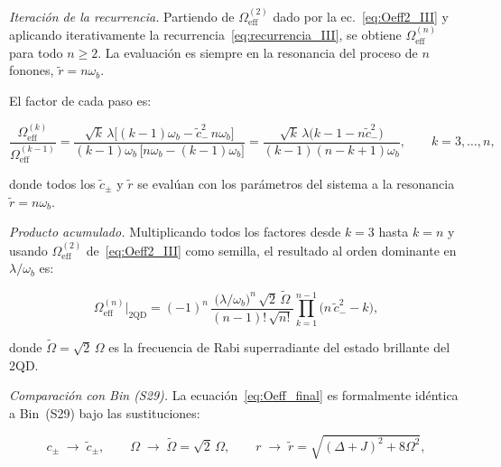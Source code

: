 \documentclass[12pt]{article}
\begin{document}

\textit{Iteración de la recurrencia.}
Partiendo de $\Omega_\mathrm{eff}^{(2)}$ dado por la
ec.~\eqref{eq:Oeff2_III} y aplicando iterativamente la
recurrencia~\eqref{eq:recurrencia_III}, se obtiene
$\Omega_\mathrm{eff}^{(n)}$ para todo $n \geq 2$.
La evaluación es siempre en la resonancia del proceso de
$n$ fonones, $\tilde{r} = n\omega_b$.

\medskip
\noindent
El factor de cada paso es:

\begin{equation}
	\frac{\Omega_\mathrm{eff}^{(k)}}{\Omega_\mathrm{eff}^{(k-1)}}
	= \frac{\sqrt{k}\,\lambda\bigl[(k-1)\omega_b
		- \tilde{c}_-^2\,n\omega_b\bigr]}
	{(k-1)\omega_b\,\bigl[n\omega_b - (k-1)\omega_b\bigr]}
	= \frac{\sqrt{k}\,\lambda\bigl(k-1 - n\tilde{c}_-^2\bigr)}
	{(k-1)(n-k+1)\omega_b},
	\qquad k = 3,\ldots,n,
	\label{eq:factor_k}
\end{equation}

\noindent
donde todos los $\tilde{c}_\pm$ y $\tilde{r}$ se evalúan con los
parámetros del sistema a la resonancia $\tilde{r} = n\omega_b$.

\medskip
\noindent
\textit{Producto acumulado.}
Multiplicando todos los factores desde $k=3$ hasta $k=n$ y
usando $\Omega_\mathrm{eff}^{(2)}$ de~\eqref{eq:Oeff2_III}
como semilla, el resultado al orden dominante en $\lambda/\omega_b$
es:

\begin{equation}
	\Omega_\mathrm{eff}^{(n)}\big|_{2\mathrm{QD}}
	= (-1)^n\,\frac{\bigl(\lambda/\omega_b\bigr)^n\,\sqrt{2}\,\widetilde\Omega}
	{(n-1)!\,\sqrt{n!}}
	\prod_{k=1}^{n-1}\bigl(n\,\tilde{c}_-^2 - k\bigr),
	\label{eq:Oeff_final}
\end{equation}

\noindent
donde $\widetilde\Omega = \sqrt{2}\,\Omega$ es la frecuencia de Rabi
superradiante del estado brillante del 2QD.

\medskip
\noindent
\textit{Comparación con Bin (S29).}
La ecuación~\eqref{eq:Oeff_final} es formalmente idéntica a Bin~(S29)
bajo las sustituciones:

\begin{equation}
	c_\pm \;\longrightarrow\; \tilde{c}_\pm,
	\qquad
	\Omega \;\longrightarrow\; \widetilde\Omega = \sqrt{2}\,\Omega,
	\qquad
	r \;\longrightarrow\; \tilde{r} = \sqrt{(\Delta+J)^2 + 8\Omega^2},
	\label{eq:sustituciones_2QD}
\end{equation}
\end{document}
